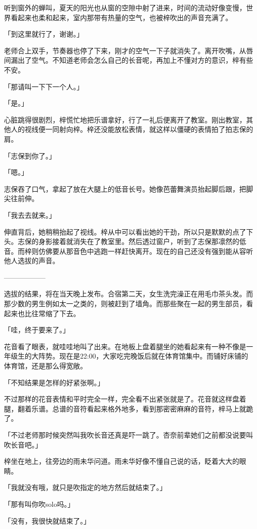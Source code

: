 \documentclass[UTF8]{ctexart}
\begin{document}
    听到窗外的蝉叫，夏天的阳光也从窗的空隙中射了进来，时间的流动好像变慢，世界看起来也柔和起来，室内那带有热量的空气，也被梓吹出的声音充满了。

    「到这里就行了，谢谢。」

    老师合上双手，节奏器也停了下来，刚才的空气一下子就消失了。离开吹嘴，从唇间漏出了空气。不知道老师会怎么自己的长音呢，再加上不懂对方的意识，梓有些不安。

    「那请叫一下下一个人。」

    「是。」

    心脏跳得很剧烈，梓慌忙地把乐谱拿好，行了一礼后便离开了教室。刚出教室，其他人的视线便一同射向梓。梓还没能放松表情，就这样以僵硬的表情拍了拍志保的肩。

    「志保到你了。」

    「嗯。」

    志保吞了口气，拿起了放在大腿上的低音长号。她像芭蕾舞演员抬起脚后跟，把脚尖往前伸。

    「我去去就来。」

    伸直背后，她稍稍抬起了视线。梓从中可以看出她的干劲，所以只是默默的点了下头。志保的身影接着就消失在了教室里。然后透过窗户，听到了志保那凛然的低音。而梓则仿佛要从那音色中逃跑一样赶快离开。现在的自己还没有强到能从容听他人选拔的声音。

    ——————

    选拔的结果，将在当天晚上发布。合宿第二天，女生洗完澡正在用毛巾茶头发。而那少数的男生例如太一之类的，则被赶到了墙角。而那些聚在一起的男生部员，看起来也比往常缩了下去。

    「哇，终于要来了。」

    花音看了眼表，就哇哇地叫了出来。在地板上盘着腿坐的她看起来有一种不像是一年级生的大阵势。现在是22:00，大家吃完晚饭后就在体育馆集中。而铺好床铺的体育馆，还是那么得宽敞。

    「不知结果是怎样的好紧张啊。」

    不过那样的花音表情和平时完全一样，完全看不出紧张就是了。花音就这样盘着腿，翻着乐谱。总谱的音符看起来格外地多，看到那密密麻麻的音符，梓马上就跪了。

    「不过老师那时候突然叫我吹长音还真是吓一跳了。杏奈前辈她们之前都没说要叫吹长音吧。」

    梓坐在地上，往旁边的雨未华问道。雨未华好像不懂自己说的话，眨着大大的眼睛。

    「我就没有哦，就只是吹指定的地方然后就结束了。」

    「那有叫你吹solo吗。」

    「没有，我很快就结束了。」
\end{document}
